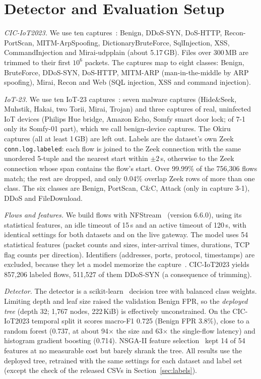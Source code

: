 \section{Detector and Evaluation Setup}\label{sec:setup}

\emph{CIC-IoT2023.} We use ten captures~\cite{neto2023ciciot2023}: Benign, DDoS-SYN, DoS-HTTP, Recon-PortScan, MITM-ArpSpoofing, DictionaryBruteForce, SqlInjection, XSS, CommandInjection and Mirai-udpplain (about 5.17\,GB). Files over 300\,MB are trimmed to their first $10^6$ packets. The captures map to eight classes: Benign, BruteForce, DDoS-SYN, DoS-HTTP, MITM-ARP (man-in-the-middle by ARP spoofing), Mirai, Recon and Web (SQL injection, XSS and command injection).

\emph{IoT-23.} We use ten IoT-23 captures~\cite{garcia2020iot23}: seven malware captures (Hide\&Seek, Muhstik, Hakai, two Torii, Mirai, Trojan) and three captures of real, uninfected IoT devices (Philips Hue bridge, Amazon Echo, Somfy smart door lock; of 7-1 only its Somfy-01 part), which we call benign-device captures. The Okiru captures (all at least 1\,GB) are left out. Labels are the dataset's own Zeek \texttt{conn.log.labeled}: each flow is joined to the Zeek connection with the same unordered 5-tuple and the nearest start within $\pm2$\,s, otherwise to the Zeek connection whose span contains the flow's start. Over 99.99\% of the 756,306 flows match; the rest are dropped, and only 0.04\% overlap Zeek rows of more than one class. The six classes are Benign, PortScan, C\&C, Attack (only in capture 3-1), DDoS and FileDownload.

\emph{Flows and features.} We build flows with NFStream~\cite{aouini2022nfstream} (version 6.6.0), using its statistical features, an idle timeout of 15\,s and an active timeout of 120\,s, with identical settings for both datasets and on the live gateway. The model uses 54 statistical features (packet counts and sizes, inter-arrival times, durations, TCP flag counts per direction). Identifiers (addresses, ports, protocol, timestamps) are excluded, because they let a model memorize the capture~\cite{arp2022dos}. CIC-IoT2023 yields 857,206 labeled flows, 511,527 of them DDoS-SYN (a consequence of trimming).

\emph{Detector.} The detector is a scikit-learn~\cite{pedregosa2011sklearn} decision tree with balanced class weights. Limiting depth and leaf size raised the validation Benign FPR, so the \emph{deployed tree} (depth 32; 1,767 nodes, 222\,KiB) is effectively unconstrained. On the CIC-IoT2023 temporal split it scores macro-F1 0.725 (Benign FPR 3.8\%), close to a random forest (0.737, at about 94$\times$ the size and 63$\times$ the single-flow latency) and histogram gradient boosting (0.714). NSGA-II feature selection~\cite{deb2002nsga2,blank2020pymoo} kept 14 of 54 features at no measurable cost but barely shrank the tree. All results use the deployed tree, retrained with the same settings for each dataset and label set (except the check of the released CSVs in Section~\ref{sec:labels}).

